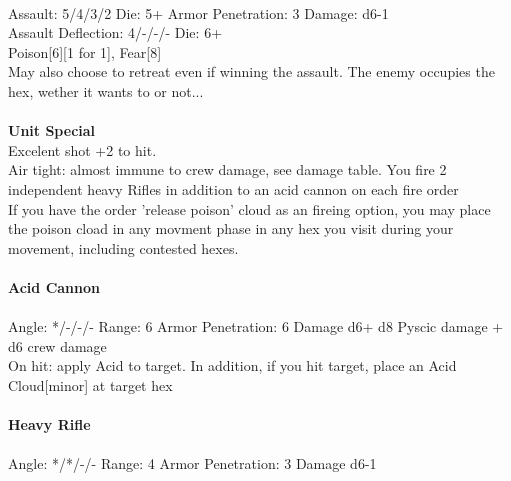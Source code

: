 \ \\
Assault: 5/4/3/2 Die: 5+ Armor Penetration: 3 Damage: d6-1 \\
Assault Deflection: 4/-/-/- Die: 6+\\
\indent Poison[6][1 for 1], Fear[8] \\ May also choose to retreat even if winning the assault. The enemy occupies the hex, wether it wants to or not... \\
\ \\

{\bf Unit Special} \\
Excelent shot +2 to hit. \\ Air tight: almost immune to crew damage, see damage table. You fire 2 independent heavy Rifles in addition to an acid cannon on each fire order\\ If you have the order 'release poison' cloud as an fireing option, you may place the poison cload in any movment phase in any hex you visit during your movement, including contested hexes.
\ \\
\ \\
{\bf Acid Cannon } \\
\ \\
Angle: */-/-/- Range: 6 Armor Penetration: 6 Damage d6+ d8 Pyscic damage + d6 crew damage \\
\indent On hit: apply Acid to target. In addition, if you hit target, place an Acid Cloud[minor] at target hex \\



\ \\
{\bf Heavy Rifle } \\
\ \\
Angle: */*/-/- Range: 4 Armor Penetration: 3 Damage d6-1 \\
\indent  \\





